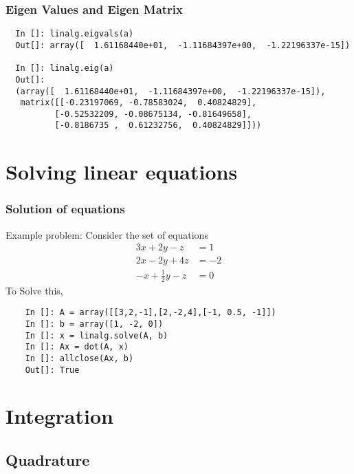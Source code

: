 \documentclass[14pt,compress]{beamer}
\begin{document}
\begin{frame}[fragile]
\frametitle{Eigen Values and Eigen Matrix}
\begin{small}
\begin{lstlisting}
  In []: linalg.eigvals(a)
  Out[]: array([  1.61168440e+01,  -1.11684397e+00,  -1.22196337e-15])

  In []: linalg.eig(a)
  Out[]: 
  (array([  1.61168440e+01,  -1.11684397e+00,  -1.22196337e-15]),
   matrix([[-0.23197069, -0.78583024,  0.40824829],
          [-0.52532209, -0.08675134, -0.81649658],
          [-0.8186735 ,  0.61232756,  0.40824829]]))
\end{lstlisting}
\end{small}
\end{frame}

\section{Solving linear equations}
\begin{frame}[fragile]
\frametitle{Solution of equations}
Example problem: Consider the set of equations
\vspace{-0.1in}
  \begin{align*}
    3x + 2y - z  & = 1 \\
    2x - 2y + 4z  & = -2 \\
    -x + \frac{1}{2}y -z & = 0
  \end{align*}
\vspace{-0.08in}
  To Solve this, 
  \begin{lstlisting}
    In []: A = array([[3,2,-1],[2,-2,4],[-1, 0.5, -1]])
    In []: b = array([1, -2, 0])
    In []: x = linalg.solve(A, b)
    In []: Ax = dot(A, x)
    In []: allclose(Ax, b)
    Out[]: True
  \end{lstlisting}
\end{frame}


\section{Integration}

\subsection{Quadrature}
\end{document}
